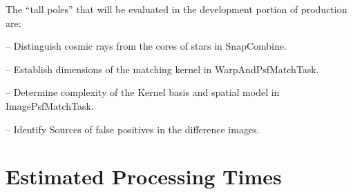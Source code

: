 \documentclass[prd, nofootinbib, floatfix, 11pt,tightenlines,times]{article}
\begin{document}
The ``tall poles'' that will be evaluated in the development portion of production are:

-- Distinguish cosmic rays from the cores of stars in SnapCombine.

-- Establish dimensions of the matching kernel in WarpAndPsfMatchTask.

-- Determine complexity of the Kernel basis and spatial model in ImagePsfMatchTask.

-- Identify Sources of false positives in the difference images.



\clearpage 
\section{Estimated Processing Times} 
\end{document}
